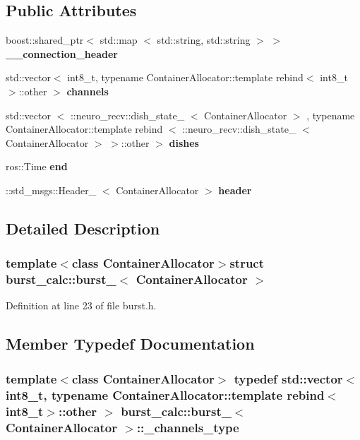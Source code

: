 \subsection*{\-Public \-Attributes}
\begin{DoxyCompactItemize}
\item 
boost\-::shared\-\_\-ptr$<$ std\-::map\*
$<$ std\-::string, std\-::string $>$ $>$ {\bf \-\_\-\-\_\-connection\-\_\-header}
\item 
std\-::vector$<$ int8\-\_\-t, typename \*
\-Container\-Allocator\-::template \*
rebind$<$ int8\-\_\-t $>$\-::other $>$ {\bf channels}
\item 
std\-::vector\*
$<$ \-::neuro\-\_\-recv\-::dish\-\_\-state\-\_\-\*
$<$ \-Container\-Allocator $>$\*
, typename \*
\-Container\-Allocator\-::template \*
rebind\*
$<$ \-::neuro\-\_\-recv\-::dish\-\_\-state\-\_\-\*
$<$ \-Container\-Allocator $>$\*
 $>$\-::other $>$ {\bf dishes}
\item 
ros\-::\-Time {\bf end}
\item 
\-::std\-\_\-msgs\-::\-Header\-\_\-\*
$<$ \-Container\-Allocator $>$ {\bf header}
\end{DoxyCompactItemize}


\subsection{\-Detailed \-Description}
\subsubsection*{template$<$class \-Container\-Allocator$>$struct burst\-\_\-calc\-::burst\-\_\-$<$ Container\-Allocator $>$}



\-Definition at line 23 of file burst.\-h.



\subsection{\-Member \-Typedef \-Documentation}
\subsubsection[{\-\_\-channels\-\_\-type}]{\setlength{\rightskip}{0pt plus 5cm}template$<$class \-Container\-Allocator$>$ typedef std\-::vector$<$int8\-\_\-t, typename \-Container\-Allocator\-::template rebind$<$int8\-\_\-t$>$\-::other $>$ {\bf burst\-\_\-calc\-::burst\-\_\-}$<$ \-Container\-Allocator $>$\-::{\bf \-\_\-channels\-\_\-type}}\label{structburst__calc_1_1burst___af08427b4ec2ed3203dce83fd7ca47909}


